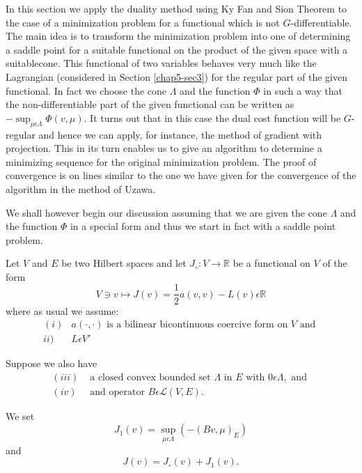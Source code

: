In this section we apply the duality method using Ky Fan and Sion Theorem to the case of a minimization problem for a functional which is not $G$-differentiable. The main idea is to transform the minimization problem into one of determining a saddle point for a suitable functional on the product of the given space with a suitable\pageoriginale cone. This functional of two variables behaves very much like the Lagrangian (considered in Section \ref{chap5-sec3}) for the regular part of the given functional. In fact we choose the cone $\Lambda$ and the function $\Phi$ in such a way that the non-differentiable part of the given functional can be written as $-\sup_{\mu \epsilon \Lambda} \Phi (v, \mu)$. It turns out that in this case the dual cost function will be $G$-regular and hence we can apply, for instance, the method of gradient with projection. This in its turn enables us to give an algorithm to determine a minimizing sequence for the original minimization problem. The proof of convergence is on lines similar to the one we have given for  the convergence of the algorithm in the method of Uzawa.

We shall however begin our discussion assuming that we are given the cone $\Lambda$ and the function $\Phi$ in a special form and thus we start in fact with a saddle point problem.

Let $V$ and $E$ be two Hilbert spaces and let $J_{\circ} : V \to \mathbb{R}$ be a functional on $V$ of the form
\begin{equation*}
V \ni v \mapsto J(v) = \frac{1}{2} a(v, v) - L(v) \epsilon \mathbb{R}\tag{4.1}\label{chap5-eq4.1}
\end{equation*}
where as usual we assume:
\begin{align*}
(i) & a(\cdot , \cdot) \text{ is a bilinear bicontinuous coercive form on $V$ and } \\
ii) & L \epsilon V'\tag{4.2}\label{chap5-eq4.2}
\end{align*}

Suppose we also have
\begin{align*}
(iii) & \text{ a closed convex bounded set } \Lambda \text{ in } E \text{ with } 0 \epsilon \Lambda, \text{ and }\\
(iv) & \text{ and operator } B \epsilon \mathscr{L} (V, E).\tag{4.3}\label{chap5-eq4.3}
\end{align*}

We set
\begin{equation*}
J_{1} (v) = \sup_{\mu \epsilon \Lambda} (-(Bv, \mu)_{E})\tag{4.4}\label{chap5-eq4.4}
\end{equation*}
and\pageoriginale
\begin{equation*}
J(v) = J_{\circ}(v) + J_{1}(v).\tag{4.5}\label{chap5-eq4.5}
\end{equation*}

